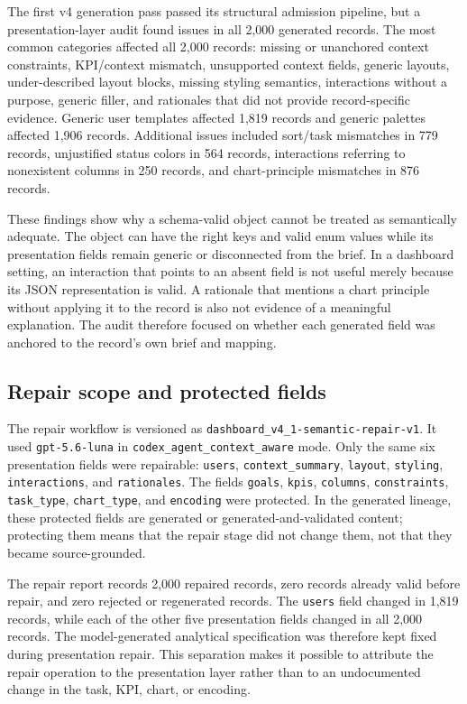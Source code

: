 The first v4 generation pass passed its structural admission pipeline, but a presentation-layer audit found issues in all 2,000 generated records. The most common categories affected all 2,000 records: missing or unanchored context constraints, KPI/context mismatch, unsupported context fields, generic layouts, under-described layout blocks, missing styling semantics, interactions without a purpose, generic filler, and rationales that did not provide record-specific evidence. Generic user templates affected 1,819 records and generic palettes affected 1,906 records. Additional issues included sort/task mismatches in 779 records, unjustified status colors in 564 records, interactions referring to nonexistent columns in 250 records, and chart-principle mismatches in 876 records.

These findings show why a schema-valid object cannot be treated as semantically adequate. The object can have the right keys and valid enum values while its presentation fields remain generic or disconnected from the brief. In a dashboard setting, an interaction that points to an absent field is not useful merely because its JSON representation is valid. A rationale that mentions a chart principle without applying it to the record is also not evidence of a meaningful explanation. The audit therefore focused on whether each generated field was anchored to the record's own brief and mapping.

\subsection{Repair scope and protected fields}

The repair workflow is versioned as \texttt{dashboard\_v4\_1-semantic-\allowbreak repair-v1}. It used \texttt{gpt-5.6-luna} in \nolinkurl{codex_agent_context_aware} mode. Only the same six presentation fields were repairable: \texttt{users}, \texttt{context\_summary}, \texttt{layout}, \texttt{styling}, \texttt{interactions}, and \texttt{rationales}. The fields \texttt{goals}, \texttt{kpis}, \texttt{columns}, \texttt{constraints}, \texttt{task\_type}, \texttt{chart\_type}, and \texttt{encoding} were protected. In the generated lineage, these protected fields are generated or generated-and-validated content; protecting them means that the repair stage did not change them, not that they became source-grounded.

The repair report records 2,000 repaired records, zero records already valid before repair, and zero rejected or regenerated records. The \texttt{users} field changed in 1,819 records, while each of the other five presentation fields changed in all 2,000 records. The model-generated analytical specification was therefore kept fixed during presentation repair. This separation makes it possible to attribute the repair operation to the presentation layer rather than to an undocumented change in the task, KPI, chart, or encoding.

